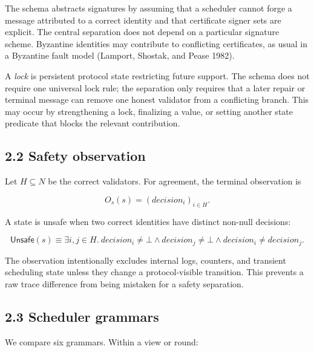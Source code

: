 \documentclass[10pt,a4paper]{article}
\begin{document}
The schema abstracts signatures by assuming that a scheduler cannot
forge a message attributed to a correct identity and that certificate
signer sets are explicit. The central separation does not depend on a
particular signature scheme. Byzantine identities may contribute to
conflicting certificates, as usual in a Byzantine fault model (Lamport,
Shostak, and Pease 1982).

A \emph{lock} is persistent protocol state restricting future support.
The schema does not require one universal lock rule; the separation only
requires that a later repair or terminal message can remove one honest
validator from a conflicting branch. This may occur by strengthening a
lock, finalizing a value, or setting another state predicate that blocks
the relevant contribution.

\subsection{2.2 Safety observation}\label{safety-observation}

Let \(H\subseteq N\) be the correct validators. For agreement, the
terminal observation is

\[
O_s(s)=(decision_i)_{i\in H}.
\]

A state is unsafe when two correct identities have distinct non-null
decisions:

\[
\mathsf{Unsafe}(s)\equiv \exists i,j\in H.\ decision_i\neq\bot\land decision_j\neq\bot\land decision_i\neq decision_j.
\]

The observation intentionally excludes internal logs, counters, and
transient scheduling state unless they change a protocol-visible
transition. This prevents a raw trace difference from being mistaken for
a safety separation.

\subsection{2.3 Scheduler grammars}\label{scheduler-grammars}

We compare six grammars. Within a view or round:
\end{document}
